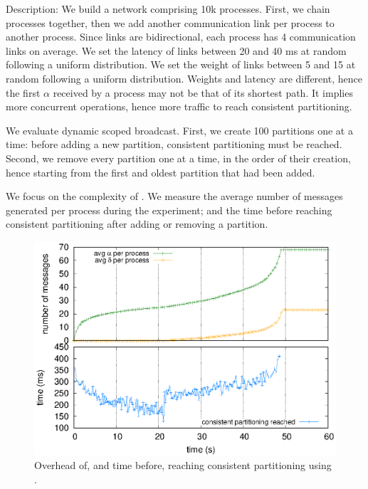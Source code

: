 \begin{asparadesc}
\item [Description:] We build a network comprising 10k
  processes. First, we chain processes together, then we add another
  communication link per process to another process. Since links are
  bidirectional, each process has 4 communication links on average. We
  set the latency of links between 20 and 40 ms at random following a
  uniform distribution. We set the weight of links between 5 and 15 at
  random following a uniform distribution. Weights and latency are
  different, hence the first $\alpha$ received by a process may not be
  that of its shortest path. It implies more concurrent operations,
  hence more traffic to reach consistent partitioning.

\noindent We evaluate dynamic scoped broadcast. First, we create 100
partitions one at a time: before adding a new partition, consistent
partitioning must be reached. Second, we remove every partition one at
a time, in the order of their creation, hence starting from the first
and oldest partition that had been added.

\noindent We focus on the complexity of \NAME. We measure the average
number of messages generated per process during the experiment; and
the time before reaching consistent partitioning after adding or
removing a partition.

\begin{figure}
  \centering\includegraphics[width=0.99\columnwidth]{img/as_cast_complexity.eps}
  \caption{\label{fig:complexity}Overhead of, and time before,
    reaching consistent partitioning using \NAME.}
\end{figure}


\end{asparadesc}
